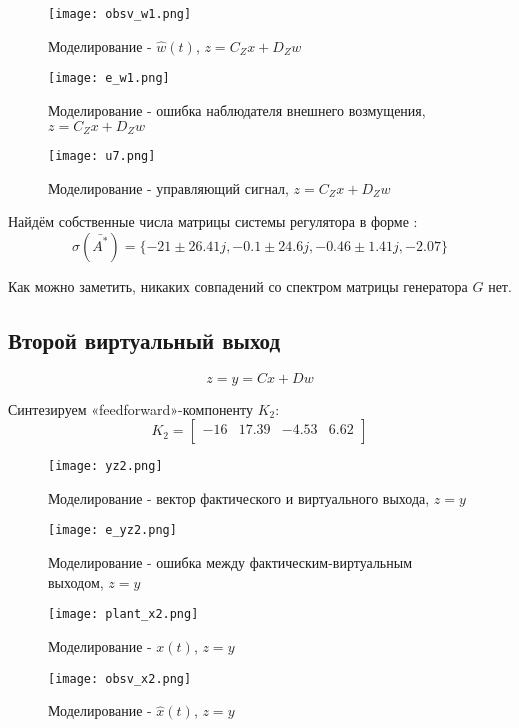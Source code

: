 \begin{figure}[ht]
  \centering
  \texttt{[image: obsv\_w1.png]}
  \caption{Моделирование - $\hat{w}(t)$, $z = C_Z x + D_Z w$}
\end{figure}

\newpage
\begin{figure}[ht]
  \centering
  \texttt{[image: e\_w1.png]}
  \caption{Моделирование - ошибка наблюдателя внешнего возмущения, $z = C_Z x + D_Z w$}
\end{figure}

\newpage
\begin{figure}[ht]
  \centering
  \texttt{[image: u7.png]}
  \caption{Моделирование - управляющий сигнал, $z = C_Z x + D_Z w$}
\end{figure}

Найдём собственные числа матрицы системы регулятора в форме :
$$
  \sigma(\bar{A^*}) = \{ -21 \pm 26.41j, -0.1 \pm 24.6j, -0.46 \pm 1.41j , -2.07 \}
$$

Как можно заметить, никаких совпадений со  спектром матрицы генератора $G$ нет. 


\clearpage
\newpage
\subsection{Второй виртуальный выход}
$$
  z = y = Cx + Dw
$$

Синтезируем «feedforward»-компоненту $K_2$:
$$
  K_2 = \begin{bmatrix}
    -16 & 17.39 & -4.53 & 6.62 \\
\end{bmatrix}
$$

\begin{figure}[ht]
  \centering
  \texttt{[image: yz2.png]}
  \caption{Моделирование - вектор фактического и виртуального выхода, $z = y$}
\end{figure}
\newpage
\begin{figure}[ht]
  \centering
  \texttt{[image: e\_yz2.png]}
  \caption{Моделирование - ошибка между фактическим-виртуальным выходом, $z = y$}
\end{figure}


\begin{figure}[ht]
  \centering
  \texttt{[image: plant\_x2.png]}
  \caption{Моделирование - $x(t)$, $z = y$}
\end{figure}
\newpage
\begin{figure}[ht]
  \centering
  \texttt{[image: obsv\_x2.png]}
  \caption{Моделирование - $\hat{x}(t)$, $z = y$}
\end{figure}


